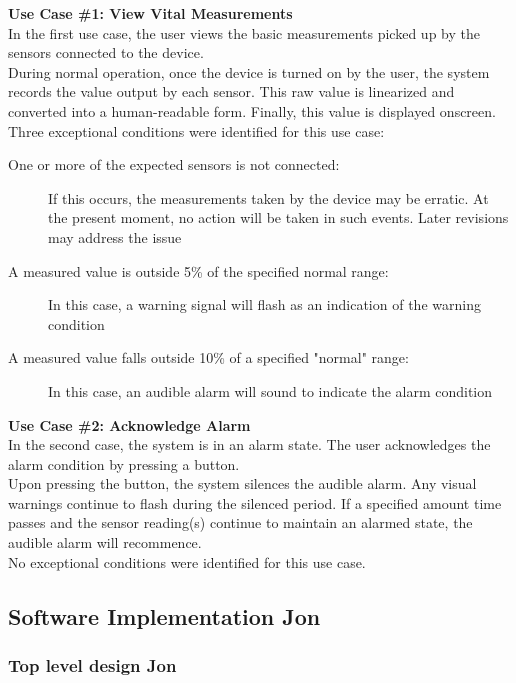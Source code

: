 \documentclass[12pt]{article} %
\begin{document}
\textbf{Use Case \#1: View Vital Measurements } \\
In the first use case, the user views the basic measurements picked up by the
sensors connected to the device. \\
During normal operation, once the device is turned on by the user, the system
records the value output by each sensor. This raw value is linearized and 
converted into a human-readable form. Finally, this value is displayed onscreen. \\

Three exceptional conditions were identified for this use case: 
\begin{description}
\item [One or more of the expected sensors is not connected:] If this occurs, the measurements taken by the device may be erratic. At the present moment, no action will be taken in such events. Later revisions may address the issue
\item[A measured value is outside 5\% of the specified normal range:] In this case, a warning signal will flash as an indication of the warning condition
\item[A measured value falls outside 10\% of a specified "normal" range:] In this case, an audible alarm will sound to indicate the alarm condition
\end{description}

\textbf{Use Case \#2: Acknowledge Alarm} \\
In the second case, the system is in an alarm state. The user acknowledges
the alarm condition by pressing a button. \\
Upon pressing the button, the system silences the audible alarm. Any visual warnings continue to flash during the silenced period. If a specified amount 
time passes and the sensor reading(s) continue to maintain an alarmed state,
the audible alarm will recommence.\\ 

No exceptional conditions were identified for this use case.\\


\subsection{Software Implementation  Jon}


\subsubsection{Top level design Jon}
\end{document}
